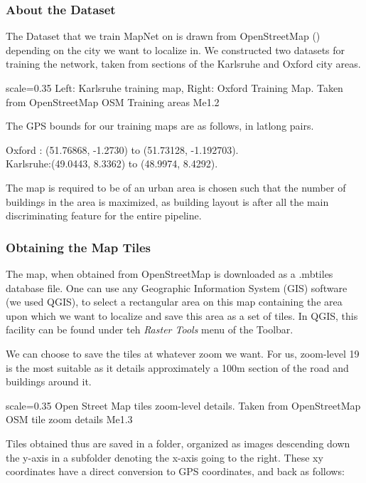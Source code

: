 \subsubsection{About the Dataset}
The Dataset that we train MapNet on is drawn from OpenStreetMap (\cite{osm2017}) depending on the city we want to localize in. We constructed two datasets for training the network, taken from sections of the Karlsruhe and Oxford city areas.

{scale=0.35}%
{Left: Karlsruhe training map, Right: Oxford Training Map. Taken from OpenStreetMap}%
{OSM Training areas}%
{Me1.2}

The GPS bounds for our training maps are as follows, in latlong pairs. 

Oxford : (51.76868, -1.2730) to (51.73128, -1.192703).\\
Karlsruhe:(49.0443, 8.3362) to (48.9974, 8.4292).

The map is required to be of an urban area is chosen such that the number of buildings in the area is maximized, as building layout is after all the main discriminating feature for the entire pipeline. 

\subsubsection{Obtaining the Map Tiles}
The map, when obtained from OpenStreetMap is downloaded as a .mbtiles database file. One can use any Geographic Information System (GIS) software (we used QGIS), to select a rectangular area on this map containing the area upon which we want to localize and save this area as a set of tiles. In QGIS, this facility can be found under teh \emph{Raster Tools} menu of the Toolbar.

We can choose to save the tiles at whatever zoom we want. For us, zoom-level 19 is the most suitable as it details approximately a 100m section of the road and buildings around it.

{scale=0.35}%
{Open Street Map tiles zoom-level details. Taken from OpenStreetMap}%
{OSM tile zoom details}%
{Me1.3}

Tiles obtained thus are saved in a folder, organized as images descending down the y-axis in a subfolder denoting the x-axis going to the right. These xy coordinates have a direct conversion to GPS coordinates, and back as follows:

